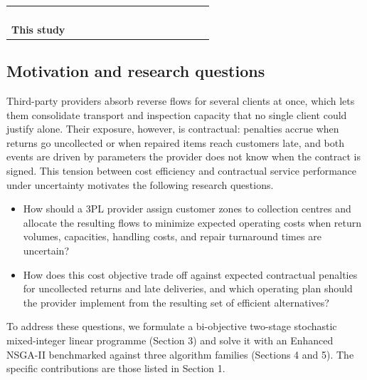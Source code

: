 \documentclass[11pt, a4paper]{article}
\newcommand{\cmark}{\textcolor{green!55!black}{\ding{51}}}
\newcommand{\xmark}{\textcolor{red!60!black}{\ding{55}}}
\begin{document}
\begin{table}[!htb]
{\begin{tabular}{@{}l*{14}{c}@{}}
\citet{liu2026online} & \xmark & \xmark & \xmark & \xmark & \xmark & \cmark & \cmark & \cmark & \xmark & \xmark & \xmark & \xmark & \xmark & \xmark \\
\citet{zhao2026embedding} & \xmark & \xmark & \xmark & \cmark & \xmark & \cmark & \xmark & \xmark & \xmark & \xmark & \xmark & \xmark & \xmark & \xmark \\
\citet{argoubi2026sustainable}& \xmark & \xmark & \xmark & \xmark & \cmark & \cmark & \cmark & \xmark & \xmark & \xmark & \cmark & \xmark & \xmark & \xmark \\
\citet{zhang2026ansga} & \xmark & \xmark & \xmark & \xmark & \xmark & \xmark & \xmark & \xmark & \xmark & \xmark & \cmark & \cmark & \xmark & \xmark \\
\midrule
\textbf{This study} & \cmark & \cmark & \cmark & \xmark & \xmark & \cmark & \cmark & \cmark & \cmark & \cmark & \xmark & \cmark & \cmark & \cmark \\
\bottomrule
\end{tabular}}
\end{table}
\subsection{Motivation and research questions}
Third-party providers absorb reverse flows for several clients at once, which lets them consolidate transport and inspection capacity that no single client could justify alone. Their exposure, however, is
contractual: penalties accrue when returns go uncollected or when
repaired items reach customers late, and both events are driven by
parameters the provider does not know when the contract is signed. This tension between cost efficiency and contractual service performance under uncertainty motivates the following research questions.
\begin{itemize}
  \item How should a 3PL provider assign customer zones to collection
  centres and allocate the resulting flows to minimize expected
  operating costs when return volumes, capacities, handling costs, and
  repair turnaround times are uncertain?
  \item How does this cost objective trade off against expected
  contractual penalties for uncollected returns and late deliveries, and which operating plan should the provider implement from the resulting set of efficient alternatives?
\end{itemize}

To address these questions, we formulate a bi-objective two-stage
stochastic mixed-integer linear programme (Section 3) and solve it with an Enhanced NSGA-II benchmarked against three algorithm families
(Sections 4 and 5). The specific contributions are those listed in
Section 1.
\end{document}
